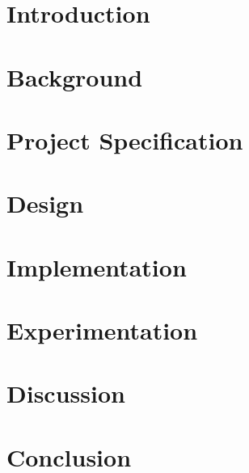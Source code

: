 \documentclass[12pt,a4paper]{report}
\begin{document}


\onehalfspacing


\tableofcontents
\listoffigures
\listofalgorithms

\chapter{Introduction}
\label{ch:introduction}


\chapter{Background}
\label{ch:background}


\chapter{Project Specification}
\label{ch:project_spec}


\chapter{Design}
\label{ch:design}


\chapter{Implementation}
\label{ch:implementation}


\chapter{Experimentation}
\label{ch:experimentation}


\chapter{Discussion}
\label{ch:discussion}


\chapter{Conclusion}
\label{ch:conclusion}


\singlespacing

\printbibliography
\end{document}
